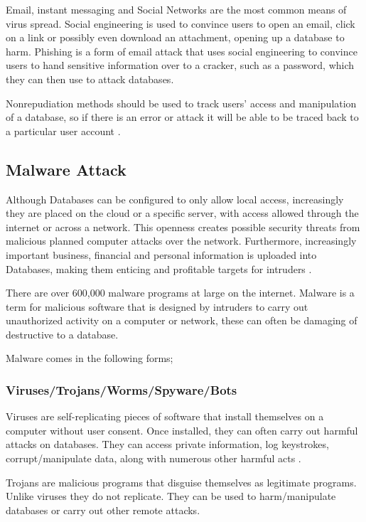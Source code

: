 \documentclass[11pt, twocolumn]{article}
\begin{document}
Email, instant messaging and Social Networks are the most common means of virus spread.  Social engineering is used to convince users to open an email, click on a link or possibly even download an attachment, opening up a database to harm.  Phishing is a form of email attack that uses social engineering to convince users to hand sensitive information over to a cracker, such as a password, which they can then use to attack databases\cite{Bas}.

Nonrepudiation methods should be used to track users’ access and manipulation of a database, so if there is an error or attack it will be able to be traced back to a particular user account \cite{Thur}.

\subsection{Malware Attack}
Although Databases can be configured to only allow local access, increasingly they are placed on the cloud or a specific server, with access allowed through the internet or across a network.  This openness creates possible security threats from malicious planned computer attacks over the network.  Furthermore, increasingly important business, financial and personal information is uploaded into Databases, making them enticing and profitable targets for intruders \cite{Bas}.

There are over 600,000 malware programs at large on the internet.  Malware is a term for malicious software that is designed by intruders to carry out unauthorized activity on a computer or network, these can often be damaging of destructive to a database\cite{Bas}.

Malware comes in the following forms;

\subsubsection{Viruses/Trojans/Worms/Spyware/Bots}
Viruses are self-replicating pieces of software that install themselves on a computer without user consent.  Once installed, they can often carry out harmful attacks on databases.  They can access private information, log keystrokes, corrupt/manipulate data, along with numerous other harmful acts \cite{Bas}.

Trojans are malicious programs that disguise themselves as legitimate programs.  Unlike viruses they do not replicate.  They can be used to harm/manipulate databases or carry out other remote attacks\cite{Bas}.
\end{document}
